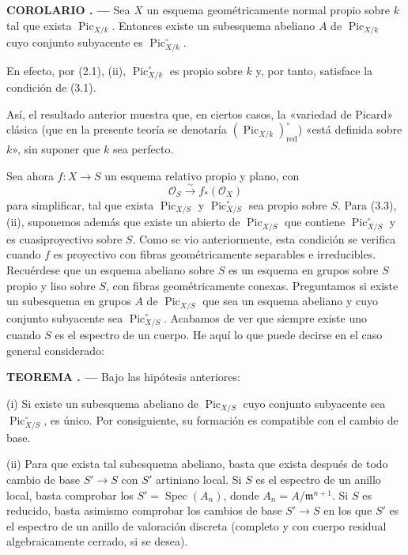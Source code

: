 \documentclass[11pt,twoside,openany]{book}
\numberwithin{equation}{section}
\newcommand{\src}[1]{%
  \phantomsection\hypertarget{src:#1}{}%
  \marginpar{\raggedleft\footnotesize\sffamily #1}%
}
\theoremstyle{plain}
\theoremstyle{definition}
\theoremstyle{remark}
\newcommand{\result}[2]{%
  \par\medskip\noindent\textbf{#1%
  \if\relax\detokenize{#2}\relax\else\space#2\fi. ---}\enspace
}
\newcommand{\FgaUnitKey}{frontmatter}
\renewcommand{\src}[1]{%
  \phantomsection\hypertarget{src:\FgaUnitKey:#1}{}%
  \marginpar{\raggedleft\footnotesize\sffamily #1}%
}
\theoremstyle{plain}
\theoremstyle{definition}
\theoremstyle{remark}
\begin{document}
\result{COROLARIO}{3.2} Sea $X$ un esquema geométricamente normal propio sobre $k$ tal que
exista $\operatorname{Pic}_{X/k}$. Entonces existe un subesquema abeliano $A$
de $\operatorname{Pic}_{X/k}$ cuyo conjunto subyacente es
$\operatorname{Pic}_{X/k}^\circ$.

En efecto, por (2.1), (ii), $\operatorname{Pic}_{X/k}^\circ$ es propio sobre
$k$ y, por tanto, satisface la condición de (3.1).

\src{237}
Así, el resultado anterior muestra que, en ciertos casos, la «variedad de
Picard» clásica (que en la presente teoría se denotaría
$(\operatorname{Pic}_{X/k})_{\mathrm{red}}^\circ$) «está definida sobre $k$»,
sin suponer que $k$ sea perfecto.

Sea ahora $f:X\longrightarrow S$ un esquema relativo propio y plano, con
\[
\mathcal O_S\xrightarrow{\sim}f_*(\mathcal O_X)
\]
para simplificar, tal que exista $\operatorname{Pic}_{X/S}$ y
$\operatorname{Pic}_{X/S}^\circ$ sea propio sobre $S$. Para (3.3), (ii),
suponemos además que existe un abierto de $\operatorname{Pic}_{X/S}$ que
contiene $\operatorname{Pic}_{X/S}^\circ$ y es cuasiproyectivo sobre $S$. Como
se vio anteriormente, esta condición se verifica cuando $f$ es proyectivo con
fibras geométricamente separables e irreducibles. Recuérdese que un esquema
abeliano sobre $S$ es un esquema en grupos sobre $S$ propio y liso sobre $S$,
con fibras geométricamente conexas. Preguntamos si existe un subesquema en
grupos $A$ de $\operatorname{Pic}_{X/S}$ que sea un esquema abeliano y cuyo
conjunto subyacente sea $\operatorname{Pic}_{X/S}^\circ$. Acabamos de ver que
siempre existe uno cuando $S$ es el espectro de un cuerpo. He aquí lo que puede
decirse en el caso general considerado:

\result{TEOREMA}{3.3} Bajo las hipótesis anteriores:

\noindent(i) Si existe un subesquema abeliano de
$\operatorname{Pic}_{X/S}$ cuyo conjunto subyacente sea
$\operatorname{Pic}_{X/S}^\circ$, es único. Por consiguiente, su formación es
compatible con el cambio de base.

\noindent(ii) Para que exista tal subesquema abeliano, basta que exista después
de todo cambio de base $S'\longrightarrow S$ con $S'$ artiniano local. Si $S$
es el espectro de un anillo local, basta comprobar los
$S'=\operatorname{Spec}(A_n)$, donde $A_n=A/\mathfrak m^{n+1}$. Si $S$ es
reducido, basta asimismo comprobar los cambios de base
$S'\longrightarrow S$ en los que $S'$ es el espectro de un anillo de
valoración discreta (completo y con cuerpo residual algebraicamente cerrado,
si se desea).
\end{document}
